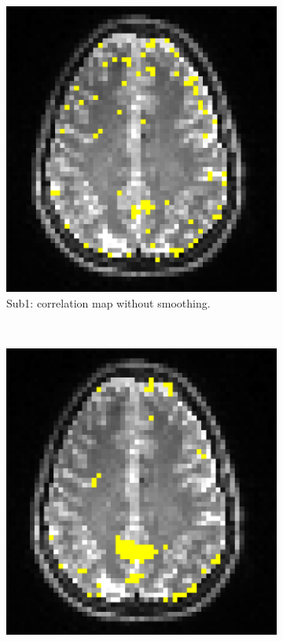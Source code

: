 \begin{figure}[p] 
  \centering 
  \begin{subfigure}[t]{0.3\textwidth}
    \centering
    \includegraphics[width=\textwidth]{figures/method1/invivo1/r1}
    \caption{Sub1: correlation map without smoothing.}
    \label{fig:invivo11}
    \end{subfigure}
~
  \begin{subfigure}[t]{0.3\textwidth}
    \centering
    \includegraphics[width=\textwidth]{figures/method1/invivo1/r1_smooth}

\end{subfigure}
\end{figure}
